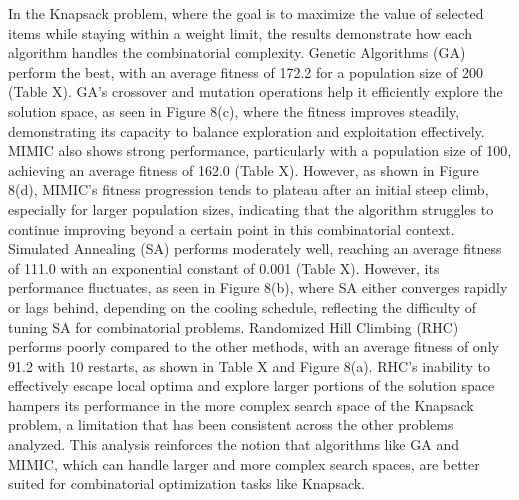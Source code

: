 In the Knapsack problem, where the goal is to maximize the value of selected items while staying within a weight limit, the results demonstrate how each algorithm handles the combinatorial complexity. Genetic Algorithms (GA) perform the best, with an average fitness of 172.2 for a population size of 200 (Table X). GA’s crossover and mutation operations help it efficiently explore the solution space, as seen in Figure 8(c), where the fitness improves steadily, demonstrating its capacity to balance exploration and exploitation effectively. MIMIC also shows strong performance, particularly with a population size of 100, achieving an average fitness of 162.0 (Table X). However, as shown in Figure 8(d), MIMIC's fitness progression tends to plateau after an initial steep climb, especially for larger population sizes, indicating that the algorithm struggles to continue improving beyond a certain point in this combinatorial context. Simulated Annealing (SA) performs moderately well, reaching an average fitness of 111.0 with an exponential constant of 0.001 (Table X). However, its performance fluctuates, as seen in Figure 8(b), where SA either converges rapidly or lags behind, depending on the cooling schedule, reflecting the difficulty of tuning SA for combinatorial problems. Randomized Hill Climbing (RHC) performs poorly compared to the other methods, with an average fitness of only 91.2 with 10 restarts, as shown in Table X and Figure 8(a). RHC’s inability to effectively escape local optima and explore larger portions of the solution space hampers its performance in the more complex search space of the Knapsack problem, a limitation that has been consistent across the other problems analyzed. This analysis reinforces the notion that algorithms like GA and MIMIC, which can handle larger and more complex search spaces, are better suited for combinatorial optimization tasks like Knapsack.
